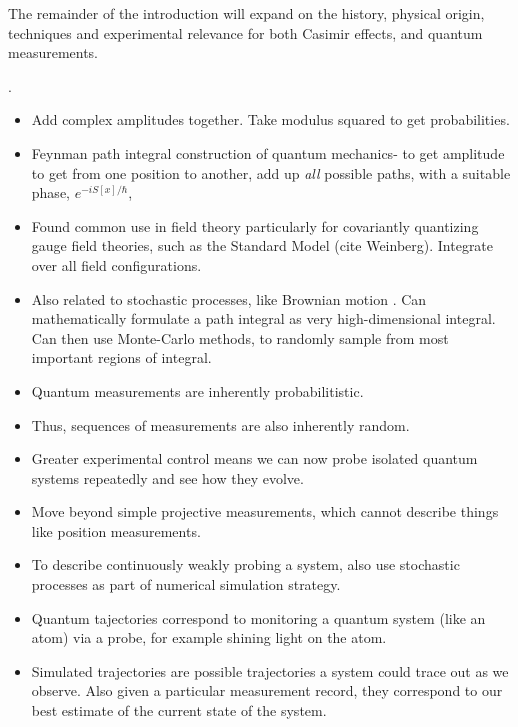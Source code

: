 The remainder of the introduction will expand on the history, physical origin, techniques and experimental 
relevance for both Casimir effects, and quantum measurements.  

.
\begin{itemize}
\item Add complex amplitudes together.  Take modulus squared to get probabilities.  
\item Feynman path integral construction of quantum mechanics- 
to get amplitude to get from one position to another, add up \emph{all} possible paths,
 with a suitable phase, $e^{-i S[x]/\hbar}$, \cite{Feynman1942, Feynman1965}
\item Found common use in field theory particularly for covariantly quantizing gauge field theories,
 such as the Standard Model (cite Weinberg).  Integrate over all field configurations.  
\item  Also related to stochastic processes, like Brownian motion \cite{Karatzas1991}.
   Can mathematically formulate a path integral as very high-dimensional integral.
  Can then use Monte-Carlo methods, to randomly sample from most important regions of integral.  
\end{itemize}

\begin{itemize}
\item Quantum measurements are inherently probabilitistic.  
\item Thus, sequences of measurements are also inherently random.  
\item Greater experimental control means we can now probe isolated quantum systems repeatedly and see how they evolve.  
\item Move beyond simple projective measurements, which cannot describe things like position measurements.
\item To describe continuously weakly probing a system, also use stochastic processes as part of
 numerical simulation strategy.
\item Quantum tajectories correspond to monitoring a quantum system (like an atom) via a probe,
 for example shining light on the atom. \cite{Carmichael1993}
\item Simulated trajectories are possible trajectories a system could trace out as we observe.
  Also given a particular measurement record, they correspond to our best estimate of the current state of the system.  
\end{itemize}

